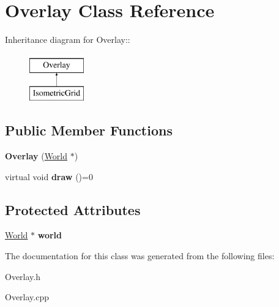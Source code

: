 \hypertarget{classOverlay}{
\section{Overlay Class Reference}
\label{classOverlay}
}
Inheritance diagram for Overlay::\begin{figure}[H]
\begin{center}
\leavevmode
\includegraphics[height=2cm]{classOverlay}
\end{center}
\end{figure}
\subsection*{Public Member Functions}
\begin{DoxyCompactItemize}
\item 
\hypertarget{classOverlay_aecb2ad2cea6041a1b1e332e041daeb13}{
{\bfseries Overlay} (\hyperlink{classWorld}{World} $\ast$)}
\label{classOverlay_aecb2ad2cea6041a1b1e332e041daeb13}

\item 
\hypertarget{classOverlay_a384639128697df8c44c3801ae9212be3}{
virtual void {\bfseries draw} ()=0}
\label{classOverlay_a384639128697df8c44c3801ae9212be3}

\end{DoxyCompactItemize}
\subsection*{Protected Attributes}
\begin{DoxyCompactItemize}
\item 
\hypertarget{classOverlay_aa0de2439856791f770c9e2e9bdc5b613}{
\hyperlink{classWorld}{World} $\ast$ {\bfseries world}}
\label{classOverlay_aa0de2439856791f770c9e2e9bdc5b613}

\end{DoxyCompactItemize}


The documentation for this class was generated from the following files:\begin{DoxyCompactItemize}
\item 
Overlay.h\item 
Overlay.cpp\end{DoxyCompactItemize}

